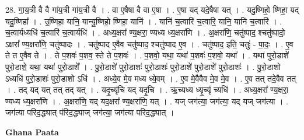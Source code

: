 \documentclass[17pt]{extarticle}
\begin{document}
28. गा॒य॒त्री वै वै गा॑य॒त्री गा॑य॒त्री वै । . वा ए॒षैषा वै वा ए॒षा । . ए॒षा यद् यदे॒षैषा यत् । . यदु॒ष्णिहो॒ ष्णिहा॒ यद् यदु॒ष्णिहा᳚ । . उ॒ष्णिहा॒ यानि॒ यान्यु॒ष्णिहो॒ ष्णिहा॒ यानि॑ । . यानि॑ च॒त्वारि॑ च॒त्वारि॒ यानि॒ यानि॑ च॒त्वारि॑ । . च॒त्वार्यध्यधि॑ च॒त्वारि॑ च॒त्वार्यधि॑ । . अध्य॒क्षरा᳚ ण्य॒क्षरा॒ ण्यध्य ध्य॒क्षरा॑णि । . अ॒क्षरा॑णि॒ चतु॑ष्पाद॒ श्चतु॑ष्पादो॒ ऽक्षरा᳚ ण्य॒क्षरा॑णि॒ चतु॑ष्पादः । . चतु॑ष्पाद ए॒वैव चतु॑ष्पाद॒ श्चतु॑ष्पाद ए॒व । . चतु॑ष्पाद॒ इति॒ चतुः॑ - पा॒दः॒ । . ए॒व ते त ए॒वैव ते । . ते प॒शवः॑ प॒शव॒ स्ते ते प॒शवः॑ । . प॒शवो॒ यथा॒ यथा॑ प॒शवः॑ प॒शवो॒ यथा᳚ । . यथा॑ पुरो॒डाशे॑ पुरो॒डाशे॒ यथा॒ यथा॑ पुरो॒डाशे᳚ । . पु॒रो॒डाशे॑ पुरो॒डाशः॑ पुरो॒डाशः॑ पुरो॒डाशे॑ पुरो॒डाशे॑ पुरो॒डाशः॑ । . पु॒रो॒डाशो ऽध्यधि॑ पुरो॒डाशः॑ पुरो॒डाशो ऽधि॑ । . अध्ये॒व मे॒व मध्य ध्ये॒वम् । . ए॒व मे॒वैवैव मे॒व मे॒व । . ए॒व तत् तदे॒वैव तत् । . तद् यद् यत् तत् तद् यत् । . यदृ॒च्यृ॑चि यद् यदृ॒चि । . ऋ॒च्यध्य ध्यृ॒च्यृ॑ च्यधि॑ । . अध्य॒क्षरा᳚ ण्य॒क्षरा॒ ण्यध्य ध्य॒क्षरा॑णि । . अ॒क्षरा॑णि॒ यद् यद॒क्षरा᳚ ण्य॒क्षरा॑णि॒ यत् । . यज् जग॑त्या॒ जग॑त्या॒ यद् यज् जग॑त्या । . जग॑त्या परिद॒द्ध्यात् प॑रिद॒द्ध्याज् जग॑त्या॒ जग॑त्या परिद॒द्ध्यात् । \newline

\textbf{Ghana Paata } \newline
\end{document}
